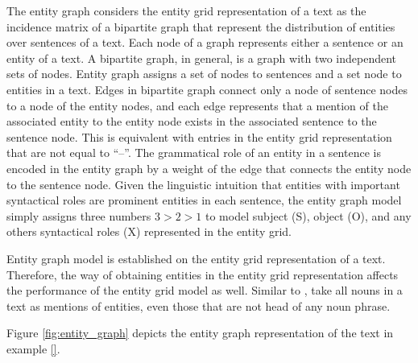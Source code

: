 The entity graph considers the entity grid representation of a text as the incidence matrix of a bipartite graph that represent the distribution of entities over sentences of a text. 
Each node of a graph represents either a sentence or an entity of a text. 
A bipartite graph, in general, is a graph with two independent sets of nodes.
Entity graph assigns a set of nodes to sentences and a set node to entities in a text.
Edges in bipartite graph connect only a node of sentence nodes to a node of the entity nodes, and each edge represents that a mention of the associated entity to the entity node exists in the associated sentence to the sentence node.  
This is equivalent with entries in the entity grid representation that are not equal to ``--''. 
The grammatical role of an entity in a sentence is encoded in the entity graph by a weight of the edge that connects the entity node to the sentence node. 
Given the linguistic intuition that entities with important syntactical roles are prominent entities in each sentence, the entity graph model simply assigns three numbers $3>2>1$ to model subject (S), object (O), and any others syntactical roles (X) represented in the entity grid. 

Entity graph model is established on the entity grid representation of a text. 
Therefore, the way of obtaining entities in the entity grid representation affects the performance of the entity grid model as well.  
Similar to ,  take all nouns in a text as mentions of entities, even those that are not head of any noun phrase. 

Figure \ref{fig:entity_graph} depicts the entity graph representation of the text in example \ref{}.

